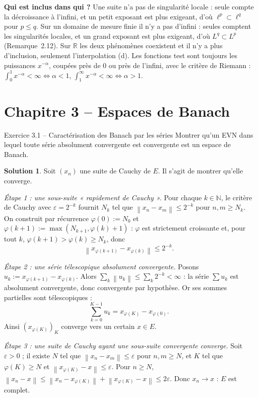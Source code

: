 \documentclass[11pt,a4paper]{article}
\newcommand{\R}{\mathbb{R}}
\newcommand{\N}{\mathbb{N}}
\newcommand{\norm}[1]{\left\|#1\right\|}
\theoremstyle{definition}
\newtheorem*{solution}{Solution}
\begin{document}
\begin{methode}
\textbf{Qui est inclus dans qui ?} Une suite n'a pas de singularité locale : seule compte la décroissance à l'infini, et un petit exposant est plus exigeant, d'où $\ell^p\subset\ell^q$ pour $p\le q$. Sur un domaine de mesure finie il n'y a pas d'infini : seules comptent les singularités locales, et un grand exposant est plus exigeant, d'où $L^q\subset L^p$ (Remarque~2.12). Sur $\R$ les deux phénomènes coexistent et il n'y a plus d'inclusion, seulement l'interpolation (d). Les fonctions test sont toujours les puissances $x^{-\alpha}$, coupées près de $0$ ou près de l'infini, avec le critère de Riemann : $\int_0^1x^{-\alpha}<\infty\iff\alpha<1$, $\int_1^\infty x^{-\alpha}<\infty\iff\alpha>1$.
\end{methode}

\section{Chapitre 3 -- Espaces de Banach}

\begin{exo}{Exercice 3.1 -- Caractérisation des Banach par les séries}
Montrer qu'un EVN dans lequel toute série absolument convergente est convergente est un espace de Banach.
\end{exo}

\begin{solution}
Soit $(x_n)$ une suite de Cauchy de $E$. Il s'agit de montrer qu'elle converge.

\emph{Étape 1 : une sous-suite « rapidement de Cauchy ».} Pour chaque $k\in\N$, le critère de Cauchy avec $\varepsilon=2^{-k}$ fournit $N_k$ tel que $\norm{x_n-x_m}\le2^{-k}$ pour $n,m\ge N_k$. On construit par récurrence $\varphi(0):=N_0$ et $\varphi(k+1):=\max(N_{k+1},\varphi(k)+1)$ : $\varphi$ est strictement croissante et, pour tout $k$, $\varphi(k+1)>\varphi(k)\ge N_k$, donc
\[
\norm{x_{\varphi(k+1)}-x_{\varphi(k)}}\le2^{-k}.
\]

\emph{Étape 2 : une série télescopique absolument convergente.} Posons $u_k:=x_{\varphi(k+1)}-x_{\varphi(k)}$. Alors $\sum_k\norm{u_k}\le\sum_k2^{-k}<\infty$ : la série $\sum u_k$ est absolument convergente, donc convergente par hypothèse. Or ses sommes partielles sont télescopiques :
\[
\sum_{k=0}^{K-1}u_k=x_{\varphi(K)}-x_{\varphi(0)} .
\]
Ainsi $(x_{\varphi(K)})_K$ converge vers un certain $x\in E$.

\emph{Étape 3 : une suite de Cauchy ayant une sous-suite convergente converge.} Soit $\varepsilon>0$ ; il existe $N$ tel que $\norm{x_n-x_m}\le\varepsilon$ pour $n,m\ge N$, et $K$ tel que $\varphi(K)\ge N$ et $\norm{x_{\varphi(K)}-x}\le\varepsilon$. Pour $n\ge N$, $\norm{x_n-x}\le\norm{x_n-x_{\varphi(K)}}+\norm{x_{\varphi(K)}-x}\le2\varepsilon$. Donc $x_n\to x$ : $E$ est complet.
\end{solution}
\end{document}
